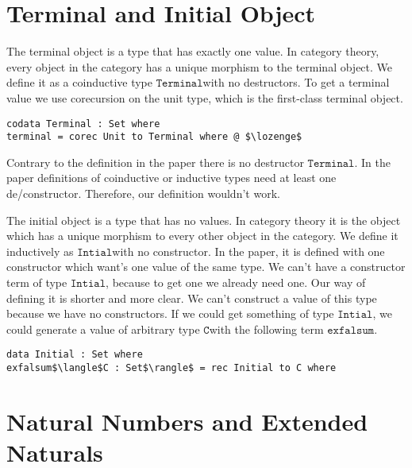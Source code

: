 \documentclass[a4paper,cleardoubleempty,BCOR1cm]{scrbook}
\begin{document}
\section{Terminal and Initial Object}
\label{sec:org1cd1678}

The terminal object is a type that has exactly one value. In category theory,
every object in the category has a unique morphism to the terminal object. We
define it as a coinductive type $\mathtt{Terminal}$\;with no destructors. To get a
terminal value we use corecursion on the unit type, which is the first-class
terminal object.
\begin{lstlisting}
codata Terminal : Set where
terminal = corec Unit to Terminal where @ $\lozenge$
\end{lstlisting}
Contrary to the definition in the paper there is no destructor $\mathtt{Terminal}$.
In the paper definitions of coinductive or inductive types need at least one
de/constructor.  Therefore, our definition wouldn't work.

The initial object is a type that has no values. In category theory it is
the object which has a unique morphism to every other object in the category.
We define it inductively as $\mathtt{Intial}$\;with no constructor. In the paper, it is
defined with one constructor which want's one value of the same
type. We can't have a constructor term of type $\mathtt{Intial}$, because to get one we already need
one. Our way of defining it is shorter and more clear. We can't construct a
value of this type because we have no constructors. If we could get something
of type $\mathtt{Intial}$, we could generate a value of arbitrary type $\mathtt{C}$\;with the
following term $\mathtt{exfalsum}$.

\begin{lstlisting}
data Initial : Set where
exfalsum$\langle$C : Set$\rangle$ = rec Initial to C where
\end{lstlisting}



\section{Natural Numbers and Extended Naturals}
\label{sec:org2792671}
\end{document}
